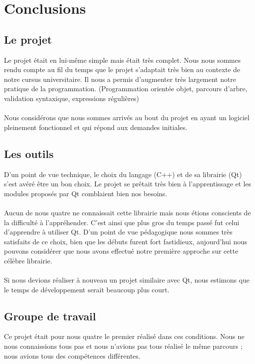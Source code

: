 \newpage{}
\section{Conclusions}

\subsection{Le projet}
Le projet était en lui-même simple mais était très complet. Nous nous sommes rendu compte au fil du temps que le projet s'adaptait très bien au contexte de notre cursus universitaire. Il nous a permis d'augmenter très largement notre pratique de la programmation. (Programmation orientée objet, parcours d’arbre, validation syntaxique, expressions régulières)
\paragraph{}
Nous considérons que nous sommes arrivés au bout du projet en ayant un logiciel pleinement fonctionnel et qui répond aux demandes initiales.


\subsection{Les outils}
D'un point de vue technique, le choix du langage (C++) et de sa librairie (Qt) s’est avéré être un bon choix. Le projet se prêtait très bien à l’apprentissage et les modules proposés par Qt comblaient bien nos besoins.

\paragraph{}
Aucun de nous quatre ne connaissait cette librairie mais nous étions conscients de la difficulté à l'appréhender. C'est ainsi que plus gros du temps passé fut celui d'apprendre à utiliser Qt. D'un point de vue pédagogique nous sommes très satisfaits de ce choix, bien que les débuts furent fort fastidieux, aujourd'hui nous pouvons considérer que nous avons effectué notre première approche sur cette célèbre librairie.
\paragraph{}
Si nous devions réaliser à nouveau un projet similaire avec Qt, nous estimons que le temps de développement serait beaucoup plus court.

\subsection{Groupe de travail}
Ce projet était pour nous quatre le premier réalisé dans ces conditions. Nous ne nous connaissions tous pas et nous n'avions pas tous réalisé le même parcours ; nous avions tous des compétences différentes.
